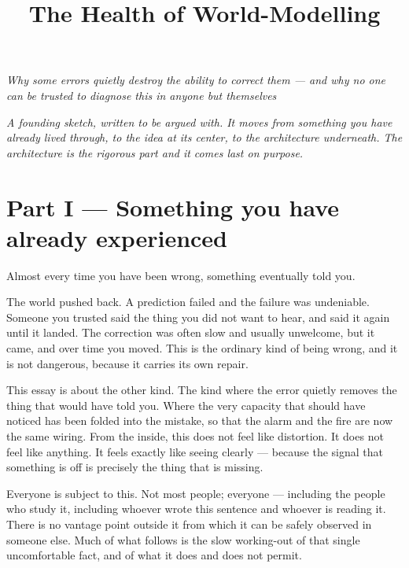 \documentclass{article}
\title{The Health of World-Modelling}
\author{}
\date{}
\begin{document}
\maketitle

\begin{center}
\large \textit{Why some errors quietly destroy the ability to correct them — and why no one can be trusted to diagnose this in anyone but themselves}
\end{center}

\begin{flushright}
\textit{A founding sketch, written to be argued with. It moves from something you have already lived through, to the idea at its center, to the architecture underneath. The architecture is the rigorous part and it comes last on purpose.}
\end{flushright}

\hrulefill

\section*{Part I --- Something you have already experienced}

Almost every time you have been wrong, something eventually told you.

The world pushed back. A prediction failed and the failure was undeniable. Someone you trusted said the thing you did not want to hear, and said it again until it landed. The correction was often slow and usually unwelcome, but it came, and over time you moved. This is the ordinary kind of being wrong, and it is not dangerous, because it carries its own repair.

This essay is about the other kind. The kind where the error quietly removes the thing that would have told you. Where the very capacity that should have noticed has been folded into the mistake, so that the alarm and the fire are now the same wiring. From the inside, this does not feel like distortion. It does not feel like anything. It feels exactly like seeing clearly --- because the signal that something is off is precisely the thing that is missing.

Everyone is subject to this. Not most people; everyone --- including the people who study it, including whoever wrote this sentence and whoever is reading it. There is no vantage point outside it from which it can be safely observed in someone else. Much of what follows is the slow working-out of that single uncomfortable fact, and of what it does and does not permit.
\end{document}

